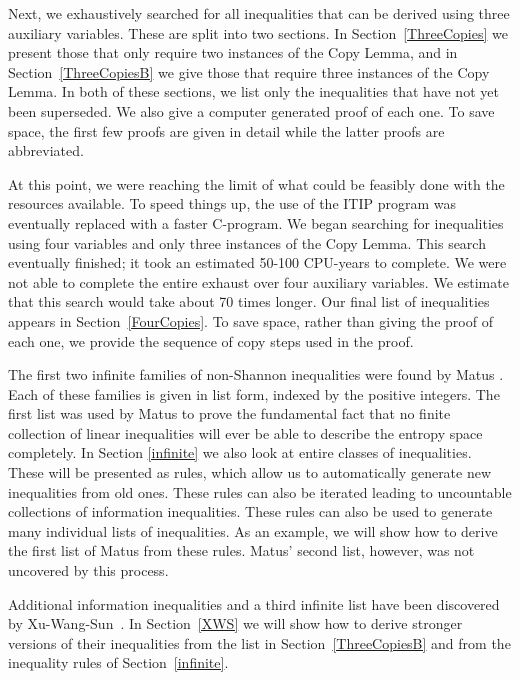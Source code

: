 \documentclass[10pt,journal]{IEEEtran}
\begin{document}
Next, we exhaustively searched for all
inequalities that can be derived using three auxiliary variables.  These are split into two sections.
In Section~\ref{ThreeCopies} we present those that only require two instances of the Copy Lemma, and in Section~\ref{ThreeCopiesB}
we give those that require three instances of the Copy Lemma.  In both of these sections, we list only the inequalities that have
not yet been superseded.  We also give a computer generated proof of each one.  To save space, the first few proofs
are given in detail while the latter proofs are abbreviated.

At this point, we were reaching the limit of what could be feasibly done with the resources available.  To speed things up,
the use of the ITIP program was eventually replaced with a faster C-program.
We began searching for inequalities using four variables and only three instances of the Copy
Lemma.  This search eventually finished; it took an estimated 50-100 CPU-years to complete.
We were not able to complete the entire exhaust over four auxiliary variables.
We estimate that this search would take about 70 times longer.  Our final list of inequalities
appears in Section~\ref{FourCopies}.  To save space, rather than giving the proof of each one, we provide the sequence of copy steps
used in the proof.

The first two infinite families of non-Shannon inequalities were found by Matus \cite{Matus}.
Each of these families is given in list form, indexed by the positive integers.  The first list was used
by Matus to prove the fundamental fact that no finite collection of linear inequalities will ever be able
to describe the entropy space completely.
In Section \ref{infinite} we also look at entire classes of inequalities.  These will be presented as rules, which
allow us to automatically generate new inequalities from old ones.  These rules can also be iterated leading to
uncountable collections of information inequalities.
These rules can also be used to generate many individual lists of inequalities.  As an example, we will show how to derive
the first list of Matus from these rules.  Matus' second list, however, was not uncovered by this process.

Additional information inequalities and a third infinite list have been discovered by Xu-Wang-Sun~\cite{XuWangSun}.
In Section~\ref{XWS} we will show  how to derive stronger versions of their inequalities
from the list in Section~\ref{ThreeCopiesB} and from the inequality rules of Section~\ref{infinite}.
\end{document}
